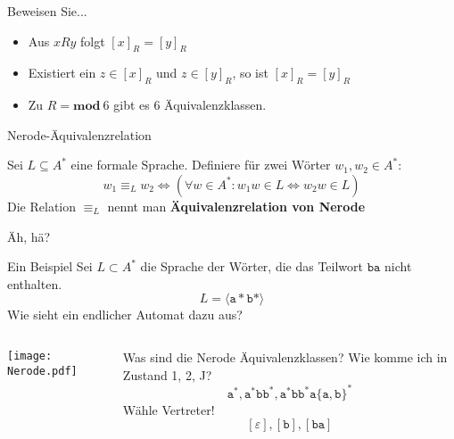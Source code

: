 \begin{frame}{Beweisen Sie...}
	\begin{itemize}
		\item Aus $xRy$ folgt $[x]_R = [y]_R$
		\item Existiert ein $z \in [x]_R$ und $z \in [y]_R$, so ist $[x]_R = [y]_R$
		\item Zu $R = \textbf{mod} \ 6$ gibt es 6 Äquivalenzklassen.
	\end{itemize}
\end{frame}

\begin{frame}{Nerode-Äquivalenzrelation}
	\begin{Definition}
		Sei $L \subseteq A^\ast$ eine formale Sprache. Definiere für zwei Wörter $w_1, w_2 \in A^\ast$: $$w_1 \equiv_L w_2 \iff (\forall w \in A^\ast: w_1 w \in L \iff w_2 w \in L)$$
		Die Relation $\equiv_L$ nennt man \textbf{Äquivalenzrelation von Nerode}
	\end{Definition} \pause
	Äh, hä?
\end{frame}

\begin{frame}{Ein Beispiel}
	Sei $L \subset A^\ast$ die Sprache der Wörter, die das Teilwort $\mathtt{ba}$ nicht enthalten. \pause
	$$L = \langle \mathtt a\ast \mathtt b\ast \rangle$$ Wie sieht ein endlicher Automat dazu aus? \pause 
	\begin{columns}
	\begin{column}{0.4\linewidth}
		\centering
		\texttt{[image: Nerode.pdf]}
	\end{column}
	\begin{column}{0.49\linewidth}
		Was sind die Nerode Äquivalenz\-klassen? \pause
		Wie komme ich in Zustand 1, 2, J? \pause
		$$\mathtt a^\ast, \mathtt a^\ast \mathtt b \mathtt b^\ast, \mathtt a^\ast \mathtt b \mathtt b^\ast \mathtt a \{\mathtt a, \mathtt b\}^\ast $$ \pause
		Wähle Vertreter! $$[\varepsilon], [\mathtt b], [\mathtt{ba}]$$
	\end{column}
	\end{columns}
\end{frame}

